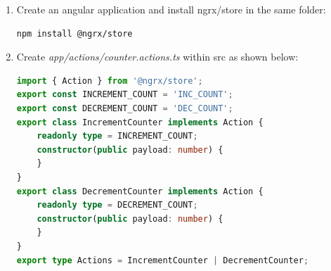 \documentclass{report}
\begin{document}
\begin{enumerate}
	\item{Create an angular application and install ngrx/store in the same folder:}
		\begin{lstlisting}[language=bash]
		npm install @ngrx/store
	\end{lstlisting}

\item{ Create \textit{app/actions/counter.actions.ts} within src as shown below:}
		\begin{lstlisting}[language=Typescript, caption=app/actions/counter.actions.ts]
		import { Action } from '@ngrx/store';
export const INCREMENT_COUNT = 'INC_COUNT';
export const DECREMENT_COUNT = 'DEC_COUNT';
export class IncrementCounter implements Action {
	readonly type = INCREMENT_COUNT;
	constructor(public payload: number) {
	}
}
export class DecrementCounter implements Action {
	readonly type = DECREMENT_COUNT;
	constructor(public payload: number) {
	}
}
export type Actions = IncrementCounter | DecrementCounter;


\end{lstlisting}
\end{enumerate}
\end{document}
